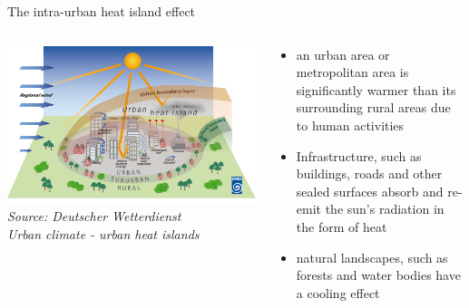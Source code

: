\begin{frame}{The intra-urban heat island effect}
	\begin{columns}[T] %
		\begin{column}{.48\textwidth}
			\includegraphics[width=\linewidth]{images/urbanheatisland_01.png}\\
			\textit{\footnotesize Source: Deutscher Wetterdienst\\Urban climate - urban heat islands}
		\end{column}%
		\hfill%
		\begin{column}{.56\textwidth}
			\begin{itemize}
				\item \glqq{}{[\textellipsis]} an urban area or metropolitan area is significantly warmer than its surrounding rural areas due to human activities\grqq{}\cite{takebayashi_chapter_2020}
				\item Infrastructure, such as buildings, roads and other sealed surfaces absorb and re-emit the sun's radiation in the form of heat
				\item natural landscapes, such as forests and water bodies have a cooling effect\cite{us_epa_learn_2014}
			\end{itemize}
		\end{column}%
	\end{columns}
\end{frame}
